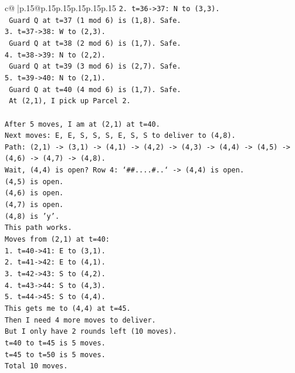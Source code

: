 \documentclass{article}
\begin{document}
{\begin{supertabular}{c@{$\;$}|p{.15\linewidth}@{}p{.15\linewidth}p{.15\linewidth}p{.15\linewidth}p{.15\linewidth}p{.15\linewidth}}
{{{\texttt{2. t=36{-}>37: N to (3,3).} \\
\texttt{   Guard Q at t=37 (1 mod 6) is (1,8). Safe.} \\
\texttt{3. t=37{-}>38: W to (2,3).} \\
\texttt{   Guard Q at t=38 (2 mod 6) is (1,7). Safe.} \\
\texttt{4. t=38{-}>39: N to (2,2).} \\
\texttt{   Guard Q at t=39 (3 mod 6) is (2,7). Safe.} \\
\texttt{5. t=39{-}>40: N to (2,1).} \\
\texttt{   Guard Q at t=40 (4 mod 6) is (1,7). Safe.} \\
\texttt{   At (2,1), I pick up Parcel 2.} \\
\\ 
\texttt{After 5 moves, I am at (2,1) at t=40.} \\
\texttt{Next moves: E, E, S, S, S, E, S, S to deliver to (4,8).} \\
\texttt{Path: (2,1) {-}> (3,1) {-}> (4,1) {-}> (4,2) {-}> (4,3) {-}> (4,4) {-}> (4,5) {-}> (4,6) {-}> (4,7) {-}> (4,8).} \\
\texttt{Wait, (4,4) is open? Row 4: `\#\#....\#..` {-}> (4,4) is open.} \\
\texttt{(4,5) is open.} \\
\texttt{(4,6) is open.} \\
\texttt{(4,7) is open.} \\
\texttt{(4,8) is 'y'.} \\
\texttt{This path works.} \\
\texttt{Moves from (2,1) at t=40:} \\
\texttt{1. t=40{-}>41: E to (3,1).} \\
\texttt{2. t=41{-}>42: E to (4,1).} \\
\texttt{3. t=42{-}>43: S to (4,2).} \\
\texttt{4. t=43{-}>44: S to (4,3).} \\
\texttt{5. t=44{-}>45: S to (4,4).} \\
\texttt{This gets me to (4,4) at t=45.} \\
\texttt{Then I need 4 more moves to deliver.} \\
\texttt{But I only have 2 rounds left (10 moves).} \\
\texttt{t=40 to t=45 is 5 moves.} \\
\texttt{t=45 to t=50 is 5 moves.} \\
\texttt{Total 10 moves.} \\
}}}
\end{supertabular}}
\end{document}
